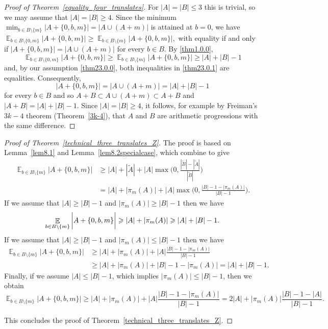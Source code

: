\documentclass[12pt,reqno]{amsart}
\DeclareMathOperator*{\E}{\mathbb{E}}
\theoremstyle{definition}
\renewcommand\leq{\leqslant}
\renewcommand\geq{\geqslant}
\renewcommand\le{\leqslant}
\renewcommand\ge{\geqslant}
\begin{document}
\begin{proof}[Proof of Theorem~\ref{equality_four_translates}]
For $|A|=|B|\le 3$ this is trivial, so we may assume that $|A|=|B|\ge 4$.
Since the minimum
$
\min_{b \in B\setminus \{m\}}\bigg|A+\{0,b,m\}\bigg|=\bigg|A\cup (A+m)\bigg|
$
is attained at $b=0$, we have
$
\E_{b \in B \setminus \{0,m\}} \bigg|A +\{0,b,m\}\bigg| \geq \E_{b \in B \setminus \{m\}} \bigg|A+\{0,b,m\}\bigg|,
$
with equality if and only if
$
\bigg|A+\{0,b,m\}\bigg|=\bigg|A\cup (A+m)\bigg|
$
for every $b\in B$. By \eqref{thm1.0.0},
\begin{equation}\label{thm23.0.1}
    \E_{b \in B \setminus \{0,m\}} \bigg|A + \{0,b,m\}\bigg| \geq \E_{b \in B \setminus \{m\}} \bigg|A+ \{0,b,m\}\bigg|\ge |A|+|B|-1
\end{equation}
and, by our assumption \eqref{thm23.0.0}, both inequalities in \eqref{thm23.0.1} are equalities. Consequently,
\[
\bigg|A+\{0,b,m\}\bigg| = \bigg|A\cup (A+m)\bigg|=|A|+|B|-1
\] for every $b\in B$ and so
$A+B \subset A\cup (A+m) \subset A+B$ and
$|A+B| = |A|+|B|-1$.
Since $|A|=|B| \geq 4$,  it follows, for example by Freiman's $3k-4$ theorem (Theorem~\ref{3k-4}), that $A$ and $B$ are arithmetic progressions with the same difference.
\end{proof}

\begin{proof}[Proof of Theorem~\ref{technical_three_translates_Z}]
The proof is based on Lemma~\ref{lem8.1} and Lemma~\ref{lem8.2specialcase}, which combine to give
\begin{align*}
\E_{b\in B \setminus \{m\}}\bigg|A+\{0,b,m\}\bigg| &\geq
|A|+|\widetilde{A}| +|A| \max\bigg(0,\frac{|\widetilde{B}| - |\widetilde{A}|}{|\widetilde{B}|}\bigg)\\
&=|A|+|\pi_m(A)|+|A|\max\bigg(0, \frac{|B|-1-|\pi_m(A)|}{|B|-1} \bigg).
\end{align*}
If we assume that $|A|\geq |B|-1$ and $|\pi_m(A)| \geq |B|-1$ then we have
\begin{equation*}
    \E_{b\in B \setminus \{m\}}\bigg|A+\{0,b,m\}\bigg| \geq |A|+|\pi_m(A)|\\
    \geq |A|+|B|-1.
\end{equation*}
If we assume that $|A|\geq |B|-1$ and $|\pi_m(A)| \leq |B|-1$ then we have
\begin{align*}
    \E_{b\in B \setminus \{m\}}\bigg|A+\{0,b,m\}\bigg| &\geq |A|+|\pi_m(A)|+ |A|\frac{|B|-1-|\pi_m(A)|}{|B|-1}\\
    &\geq |A|+|\pi_m(A)|+|B|-1-|\pi_m(A)|=|A|+|B|-1.
\end{align*}
Finally, if we assume $|A|\leq |B|-1$, which implies $|\pi_m(A)| \leq |B|-1$, then we obtain
\[
    \E_{b\in B \setminus \{m\}}\bigg|A+\{0,b,m\}\bigg| \geq |A|+|\pi_m(A)|+ |A|\frac{|B|-1-|\pi_m(A)|}{|B|-1}
    = 2|A|+|\pi_m(A)|\frac{|B|-1-|A|}{|B|-1}.
\]


\vspace{5pt}
This concludes the proof of Theorem~\ref{technical_three_translates_Z}.
\end{proof}
\end{document}
